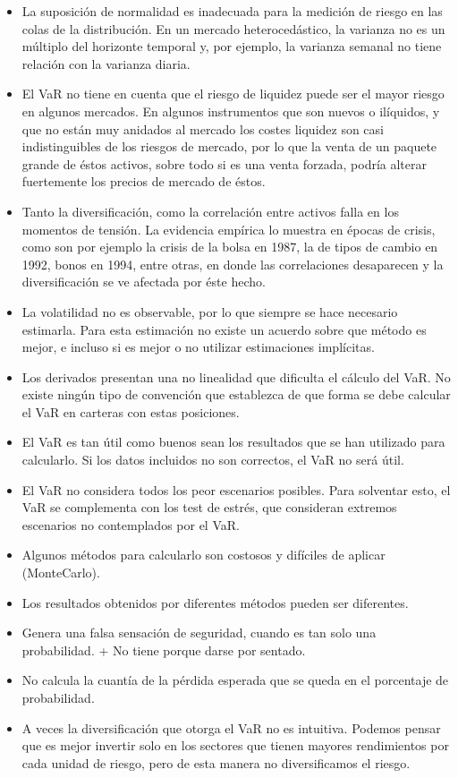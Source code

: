 \documentclass[
  12pt,
]{krantz}
\providecommand{\tightlist}{%
  \setlength{\itemsep}{0pt}\setlength{\parskip}{0pt}}
\begin{document}
\begin{itemize}
\tightlist
\item
  La suposición de normalidad es inadecuada para la medición de riesgo en las colas de la distribución. En un mercado heterocedástico, la varianza no es un múltiplo del horizonte temporal y, por ejemplo, la varianza semanal no tiene relación con la varianza diaria.
\item
  El VaR no tiene en cuenta que el riesgo de liquidez puede ser el mayor riesgo en algunos mercados. En algunos instrumentos que son nuevos o ilíquidos, y que no están muy anidados al mercado los costes liquidez son casi indistinguibles de los riesgos de mercado, por lo que la venta de un paquete grande de éstos activos, sobre todo si es una venta forzada, podría alterar fuertemente los precios de mercado de éstos.
\item
  Tanto la diversificación, como la correlación entre activos falla en los momentos de tensión. La evidencia empírica lo muestra en épocas de crisis, como son por ejemplo la crisis de la bolsa en 1987, la de tipos de cambio en 1992, bonos en 1994, entre otras, en donde las correlaciones desaparecen y la diversificación se ve afectada por éste hecho.
\item
  La volatilidad no es observable, por lo que siempre se hace necesario estimarla. Para esta estimación no existe un acuerdo sobre que método es mejor, e incluso si es mejor o no utilizar estimaciones
  implícitas.
\item
  Los derivados presentan una no linealidad que dificulta
  el cálculo del VaR. No existe ningún tipo de convención que establezca de que forma se debe calcular el VaR en carteras con estas posiciones.
\item
  El VaR es tan útil como buenos sean los resultados que se han utilizado para calcularlo. Si los datos incluidos no son correctos, el VaR no será útil.
\item
  El VaR no considera todos los peor escenarios posibles. Para solventar esto, el VaR se complementa con los test de estrés, que consideran extremos escenarios no contemplados por el VaR.
\item
  Algunos métodos para calcularlo son costosos y difíciles de aplicar (MonteCarlo).
\item
  Los resultados obtenidos por diferentes métodos pueden ser diferentes.
\item
  Genera una falsa sensación de seguridad, cuando es tan solo una probabilidad. + No tiene porque darse por sentado.
\item
  No calcula la cuantía de la pérdida esperada que se queda en el porcentaje de probabilidad.
\item
  A veces la diversificación que otorga el VaR no es intuitiva. Podemos pensar que es mejor invertir solo en los sectores que tienen mayores rendimientos por cada unidad de riesgo, pero de esta manera no diversificamos el riesgo.
\end{itemize}
\end{document}
